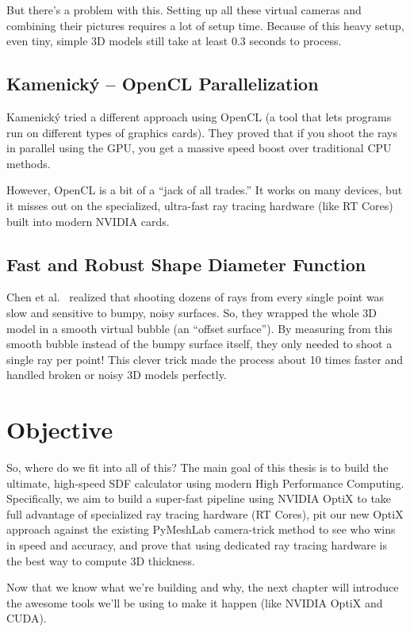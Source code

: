 But there's a problem with this. Setting up all these virtual cameras and combining their pictures requires a lot of setup time. Because of this heavy setup, even tiny, simple 3D models still take at least 0.3 seconds to process.

\subsection{Kamenick\'{y} -- OpenCL Parallelization}

Kamenick\'{y} \cite{kamenicky2014} tried a different approach using OpenCL (a tool that lets programs run on different types of graphics cards). They proved that if you shoot the rays in parallel using the GPU, you get a massive speed boost over traditional CPU methods.

However, OpenCL is a bit of a ``jack of all trades.'' It works on many devices, but it misses out on the specialized, ultra-fast ray tracing hardware (like RT Cores) built into modern NVIDIA cards.

\subsection{Fast and Robust Shape Diameter Function}

Chen et al.\ \cite{chen2018} realized that shooting dozens of rays from every single point was slow and sensitive to bumpy, noisy surfaces. So, they wrapped the whole 3D model in a smooth virtual bubble (an ``offset surface''). By measuring from this smooth bubble instead of the bumpy surface itself, they only needed to shoot a single ray per point! This clever trick made the process about 10 times faster and handled broken or noisy 3D models perfectly.

\section{Objective}

So, where do we fit into all of this? The main goal of this thesis is to build the ultimate, high-speed SDF calculator using modern High Performance Computing. Specifically, we aim to build a super-fast pipeline using NVIDIA OptiX to take full advantage of specialized ray tracing hardware (RT Cores), pit our new OptiX approach against the existing PyMeshLab camera-trick method to see who wins in speed and accuracy, and prove that using dedicated ray tracing hardware is the best way to compute 3D thickness.

Now that we know what we're building and why, the next chapter will introduce the awesome tools we'll be using to make it happen (like NVIDIA OptiX and CUDA).
